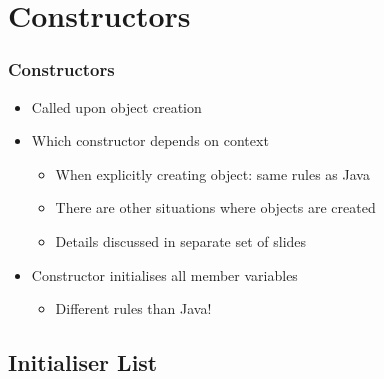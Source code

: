 \section{Constructors}
\frame{\tableofcontents[currentsection]}

\begin{frame}
  \frametitle{Constructors}
  \begin{itemize}
    \item Called upon object creation
    \item Which constructor depends on context
          \begin{itemize}
            \item When explicitly creating object: same rules as Java
            \item There are other situations where objects are created
            \item Details discussed in separate set of slides
          \end{itemize}
    \item Constructor initialises all member variables
          \begin{itemize}
            \item Different rules than Java!
          \end{itemize}
  \end{itemize}
\end{frame}

\subsection{Initialiser List}
\frame{\tableofcontents[currentsubsection]}

